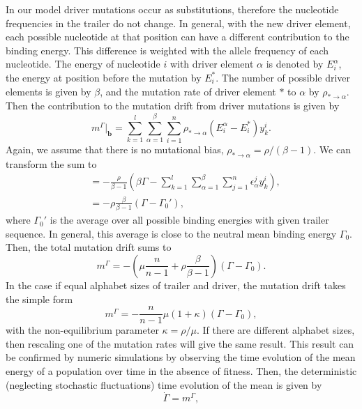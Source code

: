 In our model driver mutations occur as substitutions, therefore the nucleotide frequencies in the trailer do not change. In general, with the new driver element, each possible nucleotide at that position can have a different contribution to the binding energy. This difference is weighted with the allele frequency of each nucleotide. The energy of nucleotide $i$ with driver element $\alpha$ is denoted by $E^\alpha_i$, the energy at position before the mutation by $E^*_i$. The number of possible driver elements is given by $\beta$, and the mutation rate of driver element $*$ to $\alpha$ by $\rho_{*\rightarrow\alpha}$. Then the contribution to the mutation drift from driver mutations is given by
\begin{equation}
m^\Gamma|_\mathbf{b}=\sum_{k=1}^{l}\sum_{\alpha=1}^{\beta}\sum_{i=1}^{n}\rho_{*\rightarrow\alpha}(E^\alpha_i-E^*_i)y_k^i.
\end{equation}
Again, we assume that there is no mutational bias, $\rho_{*\rightarrow\alpha}=\rho/(\beta-1)$. We can transform the sum to
\begin{align}
	&=-\frac{\rho}{\beta-1}(\beta\Gamma-\sum_{k=1}^{l}\sum_{\alpha=1}^{\beta}\sum_{j=1}^{n}\epsilon_\alpha^jy_k^i),\nonumber\\
	&=-\rho\frac{\beta}{\beta-1}(\Gamma-\Gamma_0'),
\end{align}
where $\Gamma_0'$ is the average over all possible binding energies with given trailer sequence. In general, this average is close to the neutral mean binding energy $\Gamma_0$. Then, the total mutation drift sums to
\begin{equation}
	m^\Gamma=-\left(\mu\frac{n}{n-1}+\rho\frac{\beta}{\beta-1}\right)\left(\Gamma-\Gamma_0\right).
\end{equation}
In the case if equal alphabet sizes of trailer and driver, the mutation drift takes the simple form
\begin{equation}
    m^\Gamma=-\frac{n}{n-1}\mu\left(1+\kappa\right)\left(\Gamma-\Gamma_0\right)\label{equ:mut_drift_end},
\end{equation}
with the non-equilibrium parameter $\kappa=\rho/\mu$. If there are different alphabet sizes, then rescaling one of the mutation rates will give the same result. This result can be confirmed by numeric simulations by observing the time evolution of the mean energy of a population over time in the absence of fitness. Then, the deterministic (neglecting stochastic fluctuations) time evolution of the mean is given by
\begin{equation}
    \dot\Gamma=m^\Gamma,
\end{equation}
